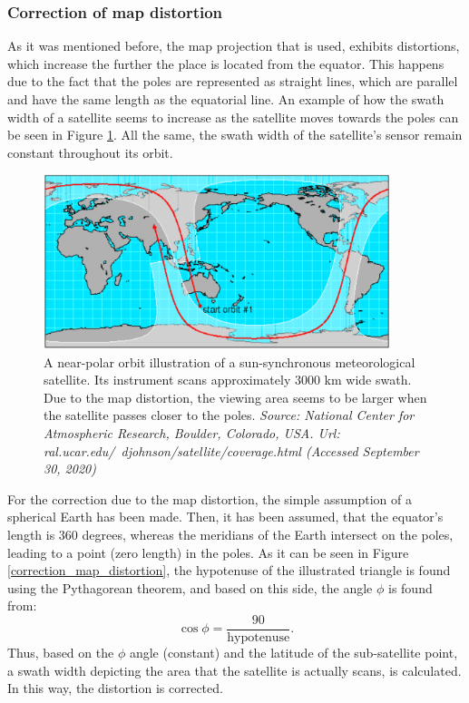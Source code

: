 \bigskip
\subsubsection{Correction of map distortion}
\label{Correction of map distortion}
\bigskip

As it was mentioned before, the map projection that is used, exhibits distortions, which increase the further the place is located from the equator. This happens due to the fact that the poles are represented as straight lines, which are parallel and have the same length as the equatorial line. An example of how the swath width of a satellite seems to increase as the satellite moves towards the poles can be seen in Figure \ref{distortion_show-swath-width}. All the same, the swath width of the satellite's sensor remain constant throughout its orbit.

\begin{figure}
\centering
\includegraphics[width=0.9\textwidth]{Images/distortion_show-swath-width.png}\caption{A near-polar orbit illustration of a sun-synchronous meteorological satellite. Its instrument scans approximately 3000 km wide swath. Due to the map distortion, the viewing area seems to be larger when the satellite passes closer to the poles. \textit{Source: National Center for Atmospheric Research, Boulder, Colorado, USA. Url: ral.ucar.edu/~djohnson/satellite/coverage.html (Accessed September 30, 2020)}}
\label{distortion_show-swath-width}
\end{figure}

For the correction due to the map distortion, the simple assumption of a spherical Earth has been made. Then, it has been assumed, that the equator's length is 360 degrees, whereas the meridians of the Earth intersect on the poles, leading to a point (zero length) in the poles. As it can be seen in Figure \ref{correction_map_distortion}, the hypotenuse of the illustrated triangle is found using the Pythagorean theorem, and based on this side, the angle $\phi$ is found from: $$ \cos{\phi} = \frac{90}{\text{hypotenuse}}.$$
Thus, based on the $\phi$ angle (constant) and the latitude of the sub-satellite point, a swath width depicting the area that the satellite is actually scans, is calculated. In this way, the distortion is corrected.

